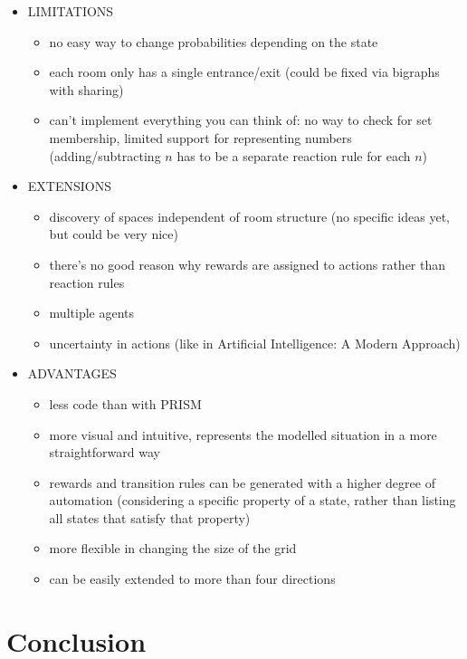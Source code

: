 \documentclass[runningheads]{llncs}
\begin{document}
\begin{itemize}
\item LIMITATIONS
  \begin{itemize}
  \item no easy way to change probabilities depending on the state
  \item each room only has a single entrance/exit (could be fixed via
    bigraphs with sharing)
  \item can't implement everything you can think of: no way to check for set
    membership, limited support for representing numbers (adding/subtracting $n$
    has to be a separate reaction rule for each $n$)
  \end{itemize}
\item EXTENSIONS
  \begin{itemize}
  \item discovery of spaces independent of room structure (no specific ideas
    yet, but could be very nice)
  \item there's no good reason why rewards are assigned to actions rather than
    reaction rules
  \item multiple agents
  \item uncertainty in actions (like in Artificial Intelligence: A Modern
    Approach)
  \end{itemize}
\item ADVANTAGES
  \begin{itemize}
  \item less code than with PRISM
  \item more visual and intuitive, represents the modelled situation in a more
    straightforward way
  \item rewards and transition rules can be generated with a higher degree of
    automation (considering a specific property of a state, rather than listing
    all states that satisfy that property)
  \item more flexible in changing the size of the grid
  \item can be easily extended to more than four directions
  \end{itemize}
\end{itemize}

\section{Conclusion}



\end{document}
